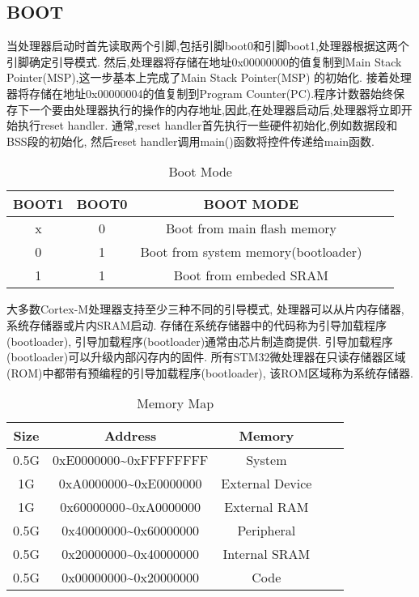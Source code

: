 \subsection{BOOT}
当处理器启动时首先读取两个引脚,包括引脚boot0和引脚boot1,处理器根据这两个引脚确定引导模式.
然后,处理器将存储在地址0x00000000的值复制到Main Stack Pointer(MSP),这一步基本上完成了Main Stack Pointer(MSP) 的初始化.
接着处理器将存储在地址0x00000004的值复制到Program Counter(PC).程序计数器始终保存下一个要由处理器执行的操作的内存地址,因此,在处理器启动后,处理器将立即开始执行reset handler.
通常,reset handler首先执行一些硬件初始化,例如数据段和BSS段的初始化, 然后reset handler调用main()函数将控件传递给main函数.
\begin{table}[htbp]
    \caption{ Boot Mode }\label{tab:table1}
    \vspace{0.5em}\centering\wuhao
    \begin{tabular}{ccccc}
    \toprule[1.5pt]
    BOOT1 & BOOT0 & BOOT MODE \\
    \midrule[1pt]
    x & 0 & Boot from main flash memory \\
    0 & 1 & Boot from system  memory(bootloader) \\
    1 & 1 & Boot from embeded SRAM  \\
    \bottomrule[1.5pt]
    \end{tabular}
    \vspace{\baselineskip}
    \end{table}

大多数Cortex-M处理器支持至少三种不同的引导模式,
处理器可以从片内存储器,系统存储器或片内SRAM启动.
存储在系统存储器中的代码称为引导加载程序(bootloader),
引导加载程序(bootloader)通常由芯片制造商提供.
引导加载程序(bootloader)可以升级内部闪存内的固件.
所有STM32微处理器在只读存储器区域(ROM)中都带有预编程的引导加载程序(bootloader),
该ROM区域称为系统存储器.
\begin{table}[tb]
    \caption{ Memory Map }\label{tab:table1}
    \vspace{0.5em}\centering\wuhao
    \begin{tabular}{ccccc}
    \toprule[1.5pt]
    Size & Address & Memory \\
    \midrule[1pt]
    0.5G & 0xE0000000\textasciitilde0xFFFFFFFF & System \\
    1G    & 0xA0000000\textasciitilde0xE0000000 & External Device \\
    1G    & 0x60000000\textasciitilde0xA0000000 & External RAM \\
    0.5G & 0x40000000\textasciitilde0x60000000 & Peripheral \\
    0.5G & 0x20000000\textasciitilde0x40000000 & Internal SRAM \\
    0.5G & 0x00000000\textasciitilde0x20000000 & Code \\
  
    \bottomrule[1.5pt]
    \end{tabular}
    \vspace{\baselineskip}
    \end{table}

